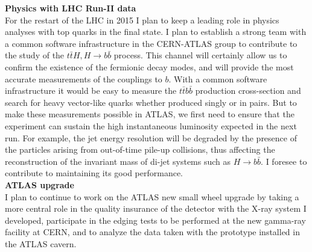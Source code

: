 \documentclass[12pt]{article}
\begin{document}
\noindent
{\bf Physics with LHC Run-II data}\\
For the restart of the LHC in 2015 I plan to keep a leading role in physics analyses with top quarks in the final state. 
I plan to establish a strong team with a common software infrastructure in the CERN-ATLAS group to contribute to the study of the $t\bar{t}H, H \rightarrow b\bar{b}$ process.
This channel will certainly allow us to confirm the existence of the fermionic decay modes, and will provide the most accurate measurements of the couplings to $b$.
With a common software infrastructure it would be easy to measure the $t\bar{t}b\bar{b}$ production cross-section and search for heavy vector-like quarks whether produced singly or in pairs.
But to make these measurements possible in ATLAS, we first need to ensure that the experiment can sustain the high instantaneous luminosity expected in the next run.
For example, the jet energy resolution will be degraded by the presence of the particles arising from out-of-time pile-up collisions, thus affecting the reconstruction of the 
invariant mass of di-jet systems such as $H \rightarrow b\bar{b}$. I foresee to contribute to maintaining its good performance.\\




\noindent
{\bf ATLAS upgrade}\\
I plan to continue to work on the ATLAS new small wheel upgrade by taking a more central role in the quality insurance of the detector with the X-ray system I developed, 
participate in the edging tests to be performed at the new gamma-ray facility at CERN, and to analyze the data taken with the prototype installed in the ATLAS cavern.\\
\end{document}
